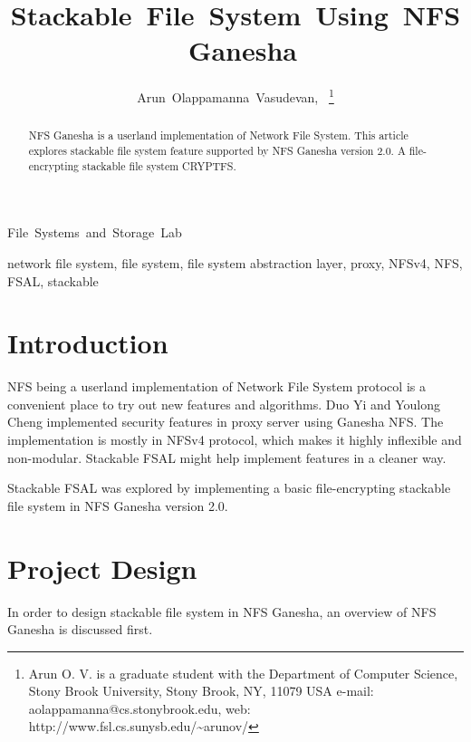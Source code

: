 \documentclass[11pt, journal, twocolumn, twoside]{IEEEtran}
\begin{document}
\title{Stackable~File~System~Using~NFS~Ganesha}

\author{Arun~Olappamanna~Vasudevan,~
\thanks{Arun O. V. is a graduate student with the Department
of Computer Science, Stony Brook University, Stony Brook,
NY, 11079 USA e-mail: aolappamanna@cs.stonybrook.edu,
web: http://www.fsl.cs.sunysb.edu/\~{}arunov/}}%

%
{File~Systems~and~Storage~Lab}

\maketitle

\begin{abstract}
NFS Ganesha is a userland implementation of Network File System. This article
explores stackable file system feature supported by NFS Ganesha version 2.0.
A file-encrypting stackable file system CRYPTFS.
\end{abstract}

\begin{IEEEkeywords}
network file system, file system, file system abstraction layer, proxy,
NFSv4, NFS, FSAL, stackable
\end{IEEEkeywords}

\IEEEpeerreviewmaketitle

\section{Introduction}
 NFS being a userland implementation of Network File
System protocol is a convenient place to try out new features and algorithms.
Duo Yi and Youlong Cheng implemented security features in proxy server
\cite{NFSv4SecurityProxy} using Ganesha NFS. The implementation is mostly in
NFSv4 protocol, which makes it highly inflexible and non-modular. Stackable
FSAL might help implement features in a cleaner way.

Stackable FSAL was explored by implementing a basic file-encrypting
stackable file system in NFS Ganesha version 2.0.

\section{Project Design}
In order to design stackable file system in NFS Ganesha, an overview of NFS
Ganesha is discussed first.
\end{document}
